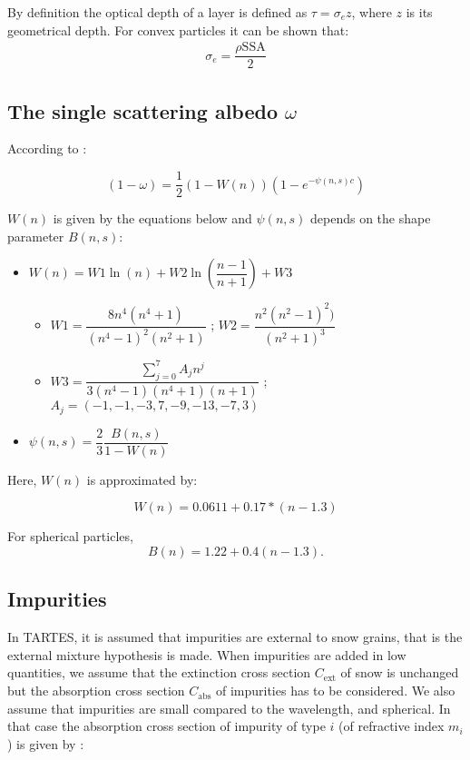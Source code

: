 \documentclass[a4paper,11pt]{article}
\begin{document}
By definition the optical depth of a layer is defined as $\tau=\sigma_e z$, where $z$ is its geometrical depth. For convex particles it can be shown that:
\begin{align}
\sigma_e=\dfrac{\rho \textrm{SSA}}{2}
\end{align}

\subsection{The single scattering albedo $\omega$}

According to \cite{kokhanovsky_light_2004}:

\begin{equation}
(1-\omega)=\dfrac{1}{2}(1-W(n))(1-e^{-\psi(n,s) c})
\end{equation}

$W(n)$ is given by the equations below and $\psi(n,s)$ depends on the shape parameter $B(n,s)$:

\begin{itemize}
\item $W(n)=W1\ln(n)+W2\ln\left(\dfrac{n-1}{n+1}\right)+W3$
\begin{itemize}
\item $W1=\dfrac{8n^4(n^4+1)}{(n^4-1)^2(n^2+1)}$ ;  $W2=\dfrac{n^2(n^2-1)^2)}{(n^2+1)^3}$ 
\item $W3=\dfrac{\displaystyle\sum_{j=0}^{7}A_jn^j}{3(n^4-1)(n^4+1)(n+1)}$ ; $A_j=(-1,-1,-3,7,-9,-13,-7,3)$
\end{itemize}
\item $\psi(n,s)=\dfrac{2}{3}\dfrac{B(n,s)}{1-W(n)}$
\end{itemize}

\noindent Here, $W(n)$ is approximated by:

\begin{equation}
W(n)=0.0611+0.17*(n-1.3) 
\end{equation}

\noindent For spherical particles,
\begin{equation}
B(n) =1.22+0.4(n-1.3).
\end{equation}

\subsection{Impurities}

In TARTES, it is assumed that impurities are external to snow grains, that is the external mixture hypothesis is made. When impurities are added in low quantities, we assume that the extinction cross section $C_{\textrm{ext}}$ of snow is unchanged but the absorption cross section $C_{\textrm{abs}}$ of impurities has to be considered. We also assume that impurities are small compared to the wavelength, and spherical. In that case the absorption cross section of impurity of type $i$ (of refractive index $m_i$) is given by \citep{kokhanovsky_light_2004}:
\end{document}
